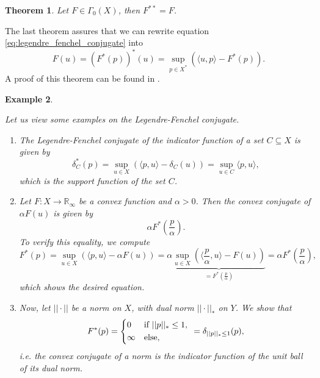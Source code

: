 \documentclass{scrreprt}
\newtheorem{theorem}{Theorem}[chapter]
\newtheorem{example}[theorem]{Example}
\begin{document}
        \begin{theorem} %
            Let $F \in \Gamma_{0}(X)$, then $F^{\ast\ast} = F$.
        \end{theorem}

        The last theorem assures that we can rewrite equation \ref{eq:legendre_fenchel_conjugate} into
            $$
                F(u) = \left( F^{\ast}(p) \right)^{\ast}(u) = \sup_{p \in X^{\ast}} \left( \langle u, p \rangle - F^{\ast}(p) \right).
            $$
        A proof of this theorem can be found in \cite{Rockafellar}.
        \begin{example}
        \label{ex:legendre_fenchel_conjugate_example}

            Let us view some examples on the Legendre-Fenchel conjugate.
            \begin{enumerate}
                \item The Legendre-Fenchel conjugate of the indicator function of a set $C \subseteq X$ is given by
                    $$
                        \delta^{\ast}_{C}(p) = \sup_{u \in X} \left( \langle p, u \rangle - \delta_{C}(u) \right) = \sup_{u \in C} \langle p, u \rangle,
                    $$
                which is the support function of the set $C$.
                \item Let $F: X \to \mathbb{R}_{\infty}$ be a convex function and $\alpha > 0$. Then the convex conjugate of $\alpha F(u)$ is given by
                    $$
                        \alpha F^{\ast}(\frac{p}{\alpha}).
                    $$
                To verify this equality, we compute
                    $$
                        F^{\ast}(p) = \sup_{u \in X} \left( \langle p, u \rangle - \alpha F(u) \right) = \alpha \underbrace{\sup_{u \in X} \left( \langle \frac{p}{\alpha}, u \rangle - F(u) \right)}_{= F^{\ast}(\frac{p}{\alpha})} = \alpha F^{\ast}(\frac{p}{\alpha}),
                    $$
                which shows the desired equation.
                \item Now, let $||\cdot||$ be a norm on $X$, with dual norm $||\cdot||_{\ast}$ on $Y$. We show that
                    $$
                        F^{\ast}(p) =
                            \begin{dcases*}
                                0 & \textnormal{if $||p||_{\ast} \le 1$,} \\
                                \infty & \textnormal{else},
                            \end{dcases*}
                        = \delta_{||p||_{\ast} \le 1}(p),
                    $$
                i.e. the convex conjugate of a norm is the indicator function of the unit ball of its dual norm.


\end{enumerate}
\end{example}
\end{document}
